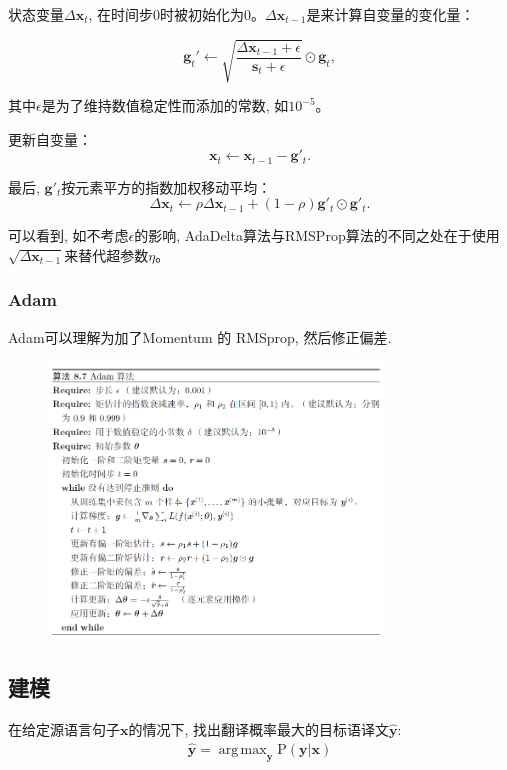\documentclass[a4paper]{article}
\newcommand{\parinterval}{\noindent\hspace{2em}}%
\DeclareMathOperator*{\argmax}{arg\, max}
\begin{document}
状态变量$\Delta\boldsymbol{x}_t$, 在时间步0时被初始化为0。$\Delta\boldsymbol{x}_{t-1}$是来计算自变量的变化量：

$$ \boldsymbol{g}_t' \leftarrow \sqrt{\frac{\Delta\boldsymbol{x}_{t-1} + \epsilon}{\boldsymbol{s}_t + \epsilon}}   \odot \boldsymbol{g}_t,  $$

其中$\epsilon$是为了维持数值稳定性而添加的常数, 如$10^{-5}$。

更新自变量：
$$\boldsymbol{x}_t \leftarrow \boldsymbol{x}_{t-1} - \boldsymbol{g}'_t. $$

最后, $\boldsymbol{g}'_t$按元素平方的指数加权移动平均：
$$\Delta\boldsymbol{x}_t \leftarrow \rho \Delta\boldsymbol{x}_{t-1} + (1 - \rho) \boldsymbol{g}'_t \odot \boldsymbol{g}'_t. $$

可以看到, 如不考虑$\epsilon$的影响, AdaDelta算法与RMSProp算法的不同之处在于使用$\sqrt{\Delta\boldsymbol{x}_{t-1}}$来替代超参数$\eta$。

\subsubsection{Adam} \citep{Kingma2014Adam}
Adam可以理解为加了Momentum 的 RMSprop, 然后修正偏差.
\begin{figure}[htp]
    \centering
     \includegraphics[width=0.8\textwidth]{adam.png}
 
    \label{fig:adm}
    \end{figure}

\subsection{建模}

\parinterval 在给定源语言句子$\mathbf{x}$的情况下, 找出翻译概率最大的目标语译文$\hat{\mathbf{y}}$:
\begin{eqnarray}
\hat{\mathbf{y}} = \argmax_{\mathbf{y}} \textrm{P} (\mathbf{y} | \mathbf{x})
\end{eqnarray}
\end{document}
